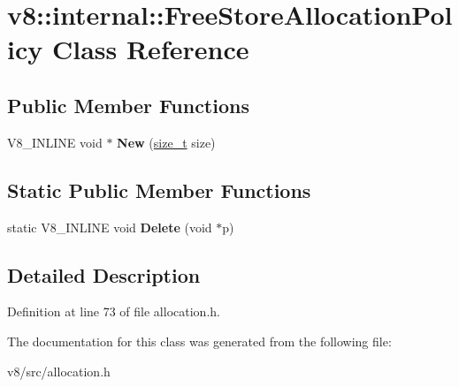 \hypertarget{classv8_1_1internal_1_1FreeStoreAllocationPolicy}{}\section{v8\+:\+:internal\+:\+:Free\+Store\+Allocation\+Policy Class Reference}
\label{classv8_1_1internal_1_1FreeStoreAllocationPolicy}
\subsection*{Public Member Functions}
\begin{DoxyCompactItemize}
\item 
\mbox{\label{classv8_1_1internal_1_1FreeStoreAllocationPolicy_a219bb3aa64104d74f94378b5f55b708b}} 
V8\+\_\+\+I\+N\+L\+I\+NE void $\ast$ {\bfseries New} (\mbox{\hyperlink{classsize__t}{size\+\_\+t}} size)
\end{DoxyCompactItemize}
\subsection*{Static Public Member Functions}
\begin{DoxyCompactItemize}
\item 
\mbox{\label{classv8_1_1internal_1_1FreeStoreAllocationPolicy_ad5553f196c68c81835a5eecc2bd04b58}} 
static V8\+\_\+\+I\+N\+L\+I\+NE void {\bfseries Delete} (void $\ast$p)
\end{DoxyCompactItemize}


\subsection{Detailed Description}


Definition at line 73 of file allocation.\+h.



The documentation for this class was generated from the following file\+:\begin{DoxyCompactItemize}
\item 
v8/src/allocation.\+h\end{DoxyCompactItemize}
